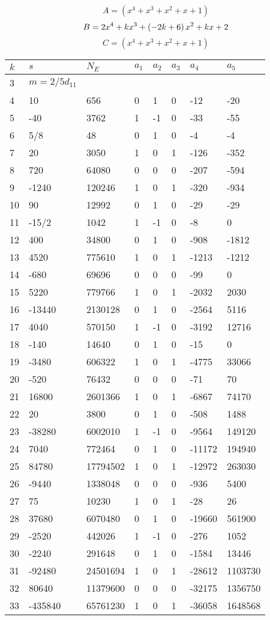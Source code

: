 \documentclass{amsart}
\begin{document}
$$A=(x^4
 + x^3
 + x^2
 + x
 + 1)$$
$$B=2\*x^4
 + k\*x^3
 + \left(-2\*k
 + 6\right) \*x^2
 + k\*x
 + 2$$
$$C=(x^4
 + x^3
 + x^2
 + x
 + 1)$$
\begin{longtable}{|l|l|l|lllll|}
\hline
$k$ & $s$ & $N_E$ & $a_1$ & $a_2$ & $a_3$ & $a_4$ & $a_5$\\
\hline
3&$m=2/5d_{11}$&&\multicolumn{5}{c|}{}\\
4&10&656&0&1&0&-12&-20\\
5&-40&3762&1&-1&0&-33&-55\\
6&5/8&48&0&1&0&-4&-4\\
7&20&3050&1&0&1&-126&-352\\
8&720&64080&0&0&0&-207&-594\\
9&-1240&120246&1&0&1&-320&-934\\
10&90&12992&0&1&0&-29&-29\\
11&-15/2&1042&1&-1&0&-8&0\\
12&400&34800&0&1&0&-908&-1812\\
13&4520&775610&1&0&1&-1213&-1212\\
14&-680&69696&0&0&0&-99&0\\
15&5220&779766&1&0&1&-2032&2030\\
16&-13440&2130128&0&1&0&-2564&5116\\
17&4040&570150&1&-1&0&-3192&12716\\
18&-140&14640&0&1&0&-15&0\\
19&-3480&606322&1&0&1&-4775&33066\\
20&-520&76432&0&0&0&-71&70\\
21&16800&2601366&1&0&1&-6867&74170\\
22&20&3800&0&1&0&-508&1488\\
23&-38280&6002010&1&-1&0&-9564&149120\\
24&7040&772464&0&1&0&-11172&194940\\
25&84780&17794502&1&0&1&-12972&263030\\
26&-9440&1338048&0&0&0&-936&5400\\
27&75&10230&1&0&1&-28&26\\
28&37680&6070480&0&1&0&-19660&561900\\
29&-2520&442026&1&-1&0&-276&1052\\
30&-2240&291648&0&1&0&-1584&13446\\
31&-92480&24501694&1&0&1&-28612&1103730\\
32&80640&11379600&0&0&0&-32175&1356750\\
33&-435840&65761230&1&0&1&-36058&1648568\\

\end{longtable}
\end{document}
